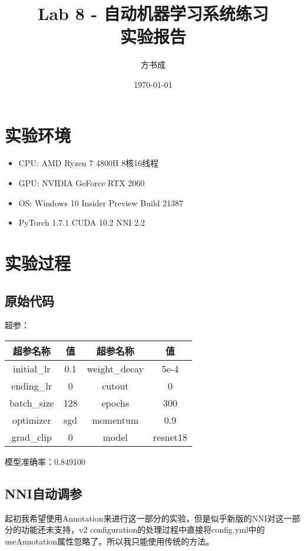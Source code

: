 \documentclass{ctexart}
\title{Lab 8 - 自动机器学习系统练习\\实验报告}
\author{方书成}
\date{\today}
\begin{document}
    \maketitle
    \section{实验环境}
    \begin{itemize}
        \item CPU: AMD Ryzen 7 4800H 8核16线程
        \item GPU: NVIDIA GeForce RTX 2060
        \item OS: Windows 10 Insider Preview Build 21387
        \item PyTorch 1.7.1 CUDA 10.2 NNI 2.2
    \end{itemize}
    \section{实验过程}
    \subsection{原始代码}
    超参：
    \begin{table}[ht]
        \centering
        \begin{tabular}{cc|cc}
            超参名称 & 值 & 超参名称 & 值\\
            \hline
            initial\_lr & 0.1 & weight\_decay & 5e-4 \\
            ending\_lr & 0 & cutout & 0 \\
            batch\_size & 128 & epochs & 300 \\
            optimizer & sgd & momentum & 0.9 \\
            grad\_clip & 0 & model & resnet18 \\
        \end{tabular}
    \end{table}

    模型准确率：0.849100
    \subsection{NNI自动调参}
    起初我希望使用Annotation来进行这一部分的实验，但是似乎新版的NNI对这一部分的功能还未支持，v2 configuration的处理过程中直接将config.yml中的useAnnotation属性忽略了。所以我只能使用传统的方法。
\end{document}
